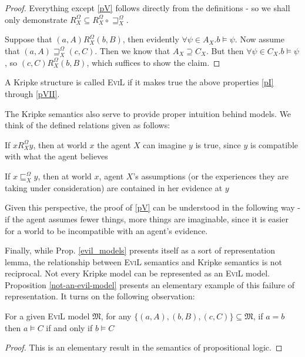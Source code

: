 \begin{proof}
  Everything except \ref{pV} follows directly from the definitions - so we shall only
  demonstrate $R^{\Omega}_X \subseteq R^{\Omega}_X \circ
  \sqsupseteq^{\Omega}_X$.
  
  Suppose that $(a, A) R^{\Omega}_X (b, B)$, then evidently $\forall \psi \in
  A_X .b \models \psi$. 
  Now assume that $(a, A) \sqsupseteq_X^{\Omega} (c,
  C)$.  Then we know that $A_X \supseteq C_X$.
  But then $\forall \psi \in
  C_X .b \models \psi$, so $(c, C) R^{\Omega}_X (b, B)$, which
  suffices to show the claim.
\end{proof}

\begin{definition}\label{evil-kripke-structures}
A Kripke structure is called \textsc{EviL} if it makes true the
  above properties \ref{pI} through \ref{pVII}.
\end{definition}


The Kripke semantics also serve to provide proper intuition behind
 models. We think of the defined relations given as follows:
\begin{itemizedot}
  \item If $x R^{\Omega}_X y$, then at world $x$ the agent $X$ can imagine $y$
  is true, since $y$ is compatible with what the agent believes 
  \item If $x \sqsubseteq^{\Omega}_X y$, then at world $x$, agent $X$'s
  assumptions (or the experiences they are taking under consideration) are
  contained in her evidence at $y$
\end{itemizedot}
Given this perspective, the proof of \ref{pV} can be understood in the
following way - if the agent assumes fewer things, more things are imaginable,
since it is easier for a world to be incompatible with an agent's evidence.

Finally, while Prop. \ref{evil_models} presents itself as a sort of
representation lemma, the relationship between \textsc{EviL} semantics
and Kripke semantics is not reciprocal.  Not every Kripke model can be
represented as an \textsc{EviL} model.  Proposition
\ref{not-an-evil-model} presents an elementary example of 
this failure of representation.  It turns on the following
observation:

\begin{lemma}\label{helper-lemma}
  For a given \textsc{EviL} model $\mathfrak{M}$, for any
  $\{(a,A),(b,B),(c,C)\} \subseteq \mathfrak{M}$, if $a = b$ then $a
  \models C$ if and only if $b \models C$
\end{lemma}
\begin{proof}
  This is an elementary result in the semantics of propositional logic.
\end{proof}


